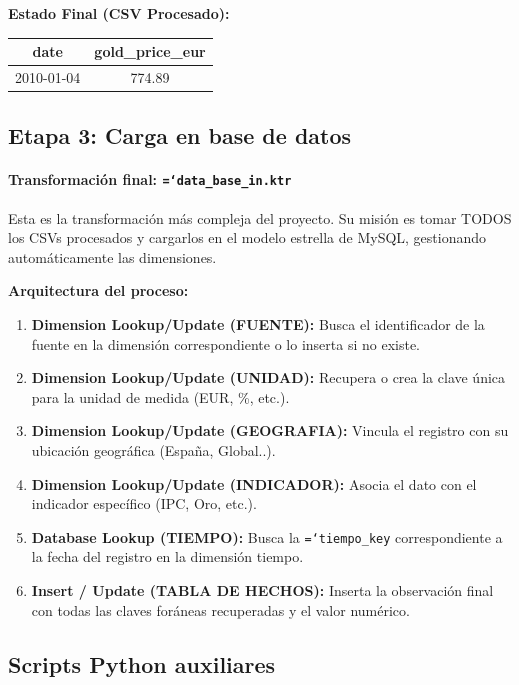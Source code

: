 \documentclass{article}
\let\oldtexttt\texttt  %
\renewcommand{\texttt}[1]{{\footnotesize\oldtexttt{\hyphenchar\font=`\-#1}}}  %
\begin{document}
\textbf{Estado Final (CSV Procesado):}
\begin{table}[H]
\centering
\footnotesize
\begin{tabular*}{0.5\textwidth}{@{\extracolsep{\fill}}cc}
\toprule
date & gold\_price\_eur \\
\midrule
2010-01-04 & 774.89 \\
\bottomrule
\end{tabular*}
\end{table}

\subsection{Etapa 3: Carga en base de datos}

\paragraph{Transformaci\'on final: \texttt{data\_base\_in.ktr}}

Esta es la transformaci\'on m\'as compleja del proyecto. Su misi\'on es tomar TODOS los CSVs procesados y cargarlos en el modelo estrella de MySQL, gestionando autom\'aticamente las dimensiones.

\textbf{Arquitectura del proceso:}

\begin{enumerate}
    \item \textbf{Dimension Lookup/Update (FUENTE):} Busca el identificador de la fuente en la dimensi\'on correspondiente o lo inserta si no existe.
    \item \textbf{Dimension Lookup/Update (UNIDAD):} Recupera o crea la clave \'unica para la unidad de medida (EUR, \%, etc.).
    \item \textbf{Dimension Lookup/Update (GEOGRAFIA):} Vincula el registro con su ubicaci\'on geogr\'afica (Espa\~na, Global..).
    \item \textbf{Dimension Lookup/Update (INDICADOR):} Asocia el dato con el indicador espec\'ifico (IPC, Oro, etc.).
    \item \textbf{Database Lookup (TIEMPO):} Busca la \texttt{tiempo\_key} correspondiente a la fecha del registro en la dimensi\'on tiempo.
    \item \textbf{Insert / Update (TABLA DE HECHOS):} Inserta la observaci\'on final con todas las claves for\'aneas recuperadas y el valor num\'erico.
\end{enumerate}

\subsection{Scripts Python auxiliares}
\end{document}
